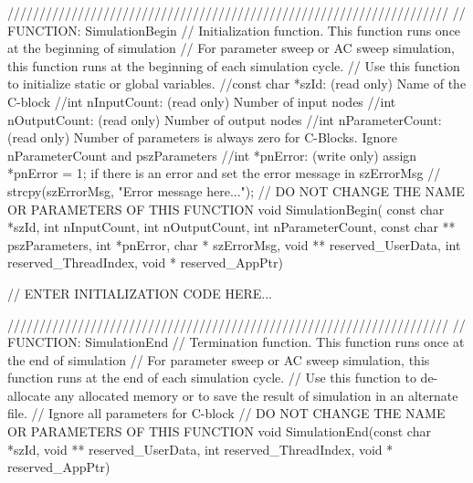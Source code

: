 \begin{mylisting}[language=c,caption=三相二相変換,label=hurokuB_32]
/////////////////////////////////////////////////////////////////////
// FUNCTION: SimulationBegin
//   Initialization function. This function runs once at the beginning of simulation
//   For parameter sweep or AC sweep simulation, this function runs at the beginning of each simulation cycle.
//   Use this function to initialize static or global variables.
//const char *szId: (read only) Name of the C-block 
//int nInputCount: (read only) Number of input nodes
//int nOutputCount: (read only) Number of output nodes
//int nParameterCount: (read only) Number of parameters is always zero for C-Blocks.  Ignore nParameterCount and pszParameters
//int *pnError: (write only)  assign  *pnError = 1;  if there is an error and set the error message in szErrorMsg
//    strcpy(szErrorMsg, "Error message here..."); 
// DO NOT CHANGE THE NAME OR PARAMETERS OF THIS FUNCTION
void SimulationBegin(
		const char *szId, int nInputCount, int nOutputCount,
		 int nParameterCount, const char ** pszParameters,
		 int *pnError, char * szErrorMsg,
		 void ** reserved_UserData, int reserved_ThreadIndex, void * reserved_AppPtr)
{
// ENTER INITIALIZATION CODE HERE...




}


/////////////////////////////////////////////////////////////////////
// FUNCTION: SimulationEnd
//   Termination function. This function runs once at the end of simulation
//   For parameter sweep or AC sweep simulation, this function runs at the end of each simulation cycle.
//   Use this function to de-allocate any allocated memory or to save the result of simulation in an alternate file.
// Ignore all parameters for C-block 
// DO NOT CHANGE THE NAME OR PARAMETERS OF THIS FUNCTION
void SimulationEnd(const char *szId, void ** reserved_UserData, int reserved_ThreadIndex, void * reserved_AppPtr)
{




}



\end{mylisting}

